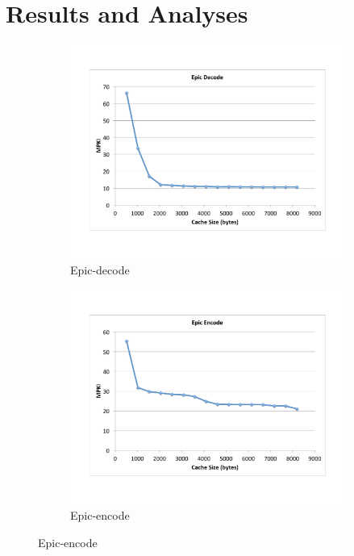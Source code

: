 \documentclass{acm_proc_article-sp}
\begin{document}
\section{Results and Analyses}
\label{sec:results}
\begin{figure}
  \centering
  \begin{subfigure}[b]{0.25\textwidth}
    \includegraphics[width=\textwidth]{figs/epic-decode-miss-curve.pdf}
    \caption{Epic-decode}
    \label{fig:epic-decode}
  \end{subfigure}%
  \begin{subfigure}[b]{0.25\textwidth}
    \includegraphics[width=\textwidth]{figs/epic-encode-miss-curve.pdf}
    \caption{Epic-encode}
    \label{fig:epic-encode}
  \end{subfigure}
  

\end{figure}
\end{document}
